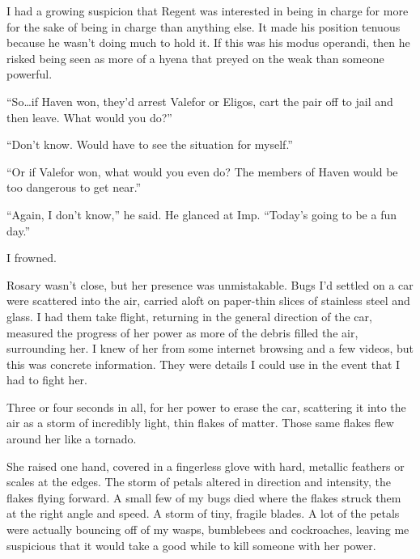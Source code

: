 I had a growing suspicion that Regent was interested in being in charge for more for the sake of being in charge than anything else.  It made his position tenuous because he wasn't doing much to hold it.  If this was his modus operandi, then he risked being seen as more of a hyena that preyed on the weak than someone powerful.



``So\ldots if Haven won, they'd arrest Valefor or Eligos, cart the pair off to jail and then leave.  What would you do?''



``Don't know.  Would have to see the situation for myself.''



``Or if Valefor won, what would you even do?  The members of Haven would be too dangerous to get near.''



``Again, I don't know,'' he said.  He glanced at Imp.  ``Today's going to be a fun day.''



I frowned.



Rosary wasn't close, but her presence was unmistakable.  Bugs I'd settled on a car were scattered into the air, carried aloft on paper-thin slices of stainless steel and glass.  I had them take flight, returning in the general direction of the car, measured the progress of her power as more of the debris filled the air, surrounding her.  I knew of her from some internet browsing and a few videos, but this was concrete information.  They were details I could use in the event that I had to fight her.



Three or four seconds in all, for her power to erase the car, scattering it into the air as a storm of incredibly light, thin flakes of matter.  Those same flakes flew around her like a tornado.



She raised one hand, covered in a fingerless glove with hard, metallic feathers or scales at the edges. The storm of petals altered in direction and intensity, the flakes flying forward.  A small few of my bugs died where the flakes struck them at the right angle and speed.  A storm of tiny, fragile blades.  A lot of the petals were actually bouncing off of my wasps, bumblebees and cockroaches, leaving me suspicious that it would take a good while to kill someone with her power.



